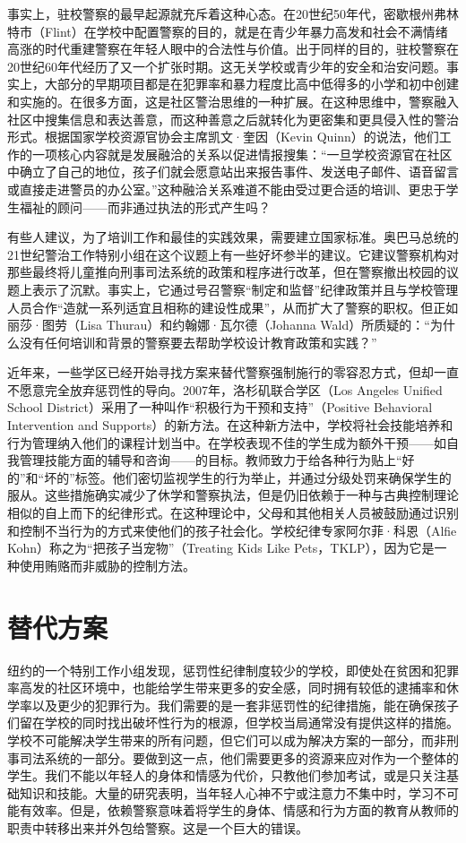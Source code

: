 \documentclass[fontset=fandol, a4paper, 12pt, openright]{ctexbook}
\begin{document}
事实上，驻校警察的最早起源就充斥着这种心态。在20世纪50年代，密歇根州弗林特市（Flint）在学校中配置警察的目的，就是在青少年暴力高发和社会不满情绪高涨的时代重建警察在年轻人眼中的合法性与价值。出于同样的目的，驻校警察在20世纪60年代经历了又一个扩张时期。这无关学校或青少年的安全和治安问题。事实上，大部分的早期项目都是在犯罪率和暴力程度比高中低得多的小学和初中创建和实施的。在很多方面，这是社区警治思维的一种扩展。在这种思维中，警察融入社区中搜集信息和表达善意，而这种善意之后就转化为更密集和更具侵入性的警治形式。根据国家学校资源官协会主席凯文·奎因（Kevin Quinn）的说法，他们工作的一项核心内容就是发展融洽的关系以促进情报搜集：“一旦学校资源官在社区中确立了自己的地位，孩子们就会愿意站出来报告事件、发送电子邮件、语音留言或直接走进警员的办公室。”这种融洽关系难道不能由受过更合适的培训、更忠于学生福祉的顾问——而非通过执法的形式产生吗？

有些人建议，为了培训工作和最佳的实践效果，需要建立国家标准。奥巴马总统的21世纪警治工作特别小组在这个议题上有一些好坏参半的建议。它建议警察机构对那些最终将儿童推向刑事司法系统的政策和程序进行改革，但在警察撤出校园的议题上表示了沉默。事实上，它通过号召警察“制定和监督”纪律政策并且与学校管理人员合作“造就一系列适宜且相称的建设性成果”，从而扩大了警察的职权。但正如丽莎·图劳（Lisa Thurau）和约翰娜·瓦尔德（Johanna Wald）所质疑的：“为什么没有任何培训和背景的警察要去帮助学校设计教育政策和实践？”

近年来，一些学区已经开始寻找方案来替代警察强制施行的零容忍方式，但却一直不愿意完全放弃惩罚性的导向。2007年，洛杉矶联合学区（Los Angeles Unified School District）采用了一种叫作“积极行为干预和支持”（Positive Behavioral Intervention and Supports）的新方法。在这种新方法中，学校将社会技能培养和行为管理纳入他们的课程计划当中。在学校表现不佳的学生成为额外干预——如自我管理技能方面的辅导和咨询——的目标。教师致力于给各种行为贴上“好的”和“坏的”标签。他们密切监视学生的行为举止，并通过分级处罚来确保学生的服从。这些措施确实减少了休学和警察执法，但是仍旧依赖于一种与古典控制理论相似的自上而下的纪律形式。在这种理论中，父母和其他相关人员被鼓励通过识别和控制不当行为的方式来使他们的孩子社会化。学校纪律专家阿尔菲·科恩（Alfie Kohn）称之为“把孩子当宠物”（Treating Kids Like Pets，TKLP），因为它是一种使用贿赂而非威胁的控制方法。

\section{替代方案}

纽约的一个特别工作小组发现，惩罚性纪律制度较少的学校，即使处在贫困和犯罪率高发的社区环境中，也能给学生带来更多的安全感，同时拥有较低的逮捕率和休学率以及更少的犯罪行为。我们需要的是一套非惩罚性的纪律措施，能在确保孩子们留在学校的同时找出破坏性行为的根源，但学校当局通常没有提供这样的措施。学校不可能解决学生带来的所有问题，但它们可以成为解决方案的一部分，而非刑事司法系统的一部分。要做到这一点，他们需要更多的资源来应对作为一个整体的学生。我们不能以年轻人的身体和情感为代价，只教他们参加考试，或是只关注基础知识和技能。大量的研究表明，当年轻人心神不宁或注意力不集中时，学习不可能有效率。但是，依赖警察意味着将学生的身体、情感和行为方面的教育从教师的职责中转移出来并外包给警察。这是一个巨大的错误。
\end{document}
